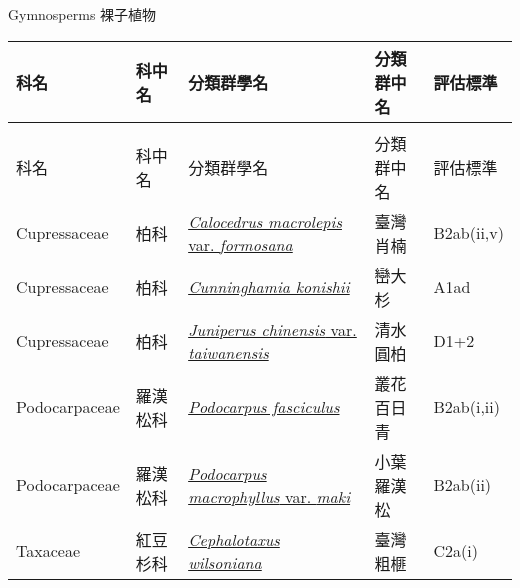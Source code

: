 \noindent\normalfont\selectfont Gymnosperms 裸子植物
\footnotesize\selectfont
        {\def\arraystretch{1.5}\tabcolsep=2pt
        \begin{longtable}{p{2.5cm}p{2.5cm}p{4.5cm}p{2.5cm}p{3cm}}
        \toprule
          科名 & 科中名 & 分類群學名 & 分類群中名 & 評估標準 \\
        \midrule 
        \endfirsthead

        \multicolumn{4}{l}{\bfseries\Large\color{red}{國家易危 (NVU) 類別維管束植物名錄(續)}} \\
        \toprule
        科名 & 科中名 & 分類群學名 & 分類群中名 & 評估標準 \\
        \midrule
        \endhead
                Cupressaceae & 柏科 & \href{http://www.theplantlist.org/tpl1.1/search?q=Calocedrus+macrolepis+var.+formosana}{\textit{Calocedrus macrolepis} var. \textit{formosana} } & 臺灣肖楠 & B2ab(ii,v) \index{Calocedrus@\textit{Calocedrus}!macrolepis@\textit{macrolepis}!var. formosana@var. \textit{formosana}}  \index{臺灣肖楠} \\
    Cupressaceae & 柏科 & \href{http://www.theplantlist.org/tpl1.1/search?q=Cunninghamia+konishii}{\textit{Cunninghamia konishii} } & 巒大杉 & A1ad \index{Cunninghamia@\textit{Cunninghamia}!konishii@\textit{konishii}}  \index{巒大杉} \\
    Cupressaceae & 柏科 & \href{http://www.theplantlist.org/tpl1.1/search?q=Juniperus+chinensis+var.+taiwanensis}{\textit{Juniperus chinensis} var. \textit{taiwanensis} } & 清水圓柏 & D1+2 \index{Juniperus@\textit{Juniperus}!chinensis@\textit{chinensis}!var. taiwanensis@var. \textit{taiwanensis}}  \index{清水圓柏} \\
    Podocarpaceae & 羅漢松科 & \href{http://www.theplantlist.org/tpl1.1/search?q=Podocarpus+fasciculus}{\textit{Podocarpus fasciculus} } & 叢花百日青 & B2ab(i,ii) \index{Podocarpus@\textit{Podocarpus}!fasciculus@\textit{fasciculus}}  \index{叢花百日青} \\
    Podocarpaceae & 羅漢松科 & \href{http://www.theplantlist.org/tpl1.1/search?q=Podocarpus+macrophyllus+var.+maki}{\textit{Podocarpus macrophyllus} var. \textit{maki} } & 小葉羅漢松 & B2ab(ii) \index{Podocarpus@\textit{Podocarpus}!macrophyllus@\textit{macrophyllus}!var. maki@var. \textit{maki}}  \index{小葉羅漢松} \\
    Taxaceae & 紅豆杉科 & \href{http://www.theplantlist.org/tpl1.1/search?q=Cephalotaxus+wilsoniana}{\textit{Cephalotaxus wilsoniana} } & 臺灣粗榧 & C2a(i) \index{Cephalotaxus@\textit{Cephalotaxus}!wilsoniana@\textit{wilsoniana}}  \index{臺灣粗榧} \\
    \bottomrule
        \end{longtable}
        }
    